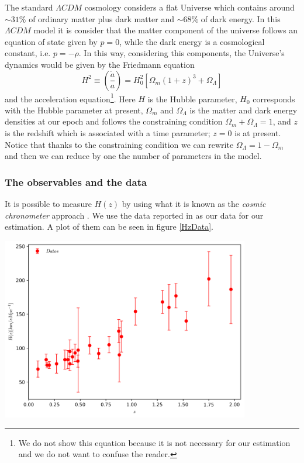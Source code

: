 \documentclass[onecolumn,           %
               showpacs,            %
               preprintnumbers,     %
               aps,                 %
               prl,          	    %
               letterpaper,             %
               superscriptaddress,      %
               nofootinbib,         %
               tightenlines,        %
               floats,floatfix      %
               ,usenatbib,
               ]{revtex4-1}
\begin{document}
The standard $\Lambda CDM$ cosmology considers a flat Universe which contains around $\sim 31\%$ of ordinary matter plus dark matter and $\sim 68\%$ of dark energy. In this $\Lambda CDM$ model it is consider that the matter component of the universe follows an equation of state given by $p=0$, while the dark energy is a cosmological constant, i.e. $p=-\rho$. In this way, considering this components, the Universe's dynamics would be given by the Friedmann equation
\begin{equation}
H^2\equiv\left(\frac{\dot a}{a}\right)=H_0^2[\Omega_m(1+z)^3+\Omega_{\Lambda}]
\end{equation}
and the acceleration equation\footnote{We do not show this equation because it is not necessary for our estimation and we do not want to confuse the reader.}. Here $H$ is the Hubble parameter, $H_0$ corresponds with the Hubble parameter at present, $\Omega_m$ and $\Omega_\Lambda$ is the matter and dark energy densities at our epoch and follows the constraining condition $\Omega_m+\Omega_\Lambda=1$, and $z$ is the redshift which is associated with a time parameter; $z=0$ is at present. Notice that thanks to the constraining condition we can rewrite $\Omega_\Lambda=1-\Omega_m$ and then we can reduce by one the number of parameters in the model. 
\subsubsection{The observables and the data}

It is possible to measure $H(z)$ by using what it is known as the \textit{cosmic chronometer} approach \cite{Hz}. We use the data reported in \cite{Hzdata} as our data for our estimation. A plot of them can be seen in figure \ref{HzData}.

\begin{minipage}{\textwidth}
\centering
\includegraphics[height=8cm]{Hzdata.png}
\label{HzData}
\end{minipage}
\end{document}
